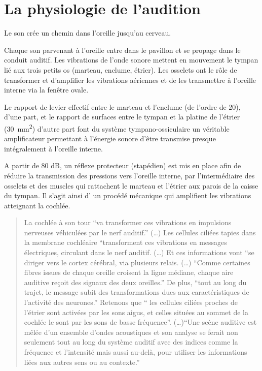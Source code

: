 \section{La physiologie de l'audition}

Le  son crée un chemin dans 
l'oreille\autocite[chap. 8, pp. 322--324]{marieb:biologie} jusqu'au cerveau.

Chaque son parvenant à l'oreille entre dans le pavillon et se propage
dans le conduit auditif. Les vibrations de l'onde sonore mettent en
mouvement le tympan lié aux trois petits os (marteau, enclume, étrier).
Les osselets ont le rôle de transformer et d'amplifier les vibrations
aériennes et de les transmettre à l'oreille interne via la fenêtre
ovale.

Le rapport de levier effectif entre le marteau et l'enclume
(de l'ordre de 20), d'une part, et le
rapport de surfaces entre le tympan et la platine de l'étrier
(\SI{30}{\milli\metre\squared}) d\textquoteright autre part font du système tympano-ossiculaire
un véritable amplificateur permettant à l\textquoteright énergie sonore
d\textquoteright être transmise presque intégralement à l\textquoteright oreille
interne.

A partir de 80 dB, un réflexe protecteur (stapédien) est mis en place
afin de réduire la transmission des pressions vers l\textquoteright oreille
interne, par l\textquoteright intermédiaire des osselets et des muscles
qui rattachent le marteau et l\textquoteright étrier aux parois de
la caisse du tympan. Il s'agit ainsi d' un procédé mécanique qui amplifient
les vibrations atteignant la cochlée. 
\begin{quotation}
	La cochlée à son tour ``va transformer ces vibrations en impulsions
	nerveuses véhiculées par le nerf auditif.'' (\dots) Les cellules ciliées
	tapies dans la membrane cochléaire ``transforment ces vibrations
	en messages électriques, circulant dans le nerf auditif. (\dots) Et
	ces informations vont ``se diriger vers le cortex cérébral, via plusieurs
	relais. (\dots) ``Comme certaines fibres issues de chaque oreille croisent
	la ligne médiane, chaque aire auditive reçoit des signaux des deux
	oreilles.'' De plus, ``tout au long du trajet, le message subit
	des transformations dues aux caractéristiques de l'activité des neurones.''
	Retenons que `` les cellules ciliées proches de l'étrier sont activées
	par les sons aigus, et celles situées au sommet de la cochlée le sont
	par les sons de basse fréquence''. (\dots)``Une scène auditive est
	mêlée d'un ensemble d'ondes acoustiques et son analyse se ferait non
	seulement tout au long du système auditif avec des indices comme la
	fréquence et l'intensité mais aussi au-delà, pour utiliser les informations
	liées aux autres sens ou au contexte.'' \autocite[chap.1, pp.~15--16]{bigand:cerveau}
\end{quotation}


